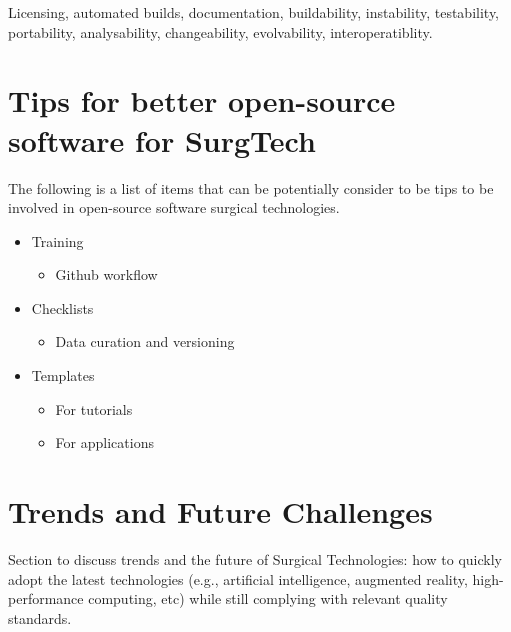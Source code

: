\documentclass{article}
\begin{document}
Licensing, automated builds, documentation, buildability, instability, testability, portability, analysability, changeability, evolvability, interoperatiblity. 






\section{Tips for better open-source software for SurgTech}
The following is a list of items that can be potentially consider to be tips to be involved in open-source software surgical technologies.
\begin{itemize}
\item Training 
    \begin{itemize}
    \item Github workflow
    \end{itemize}
\item Checklists
    \begin{itemize}
    \item Data curation and versioning
    \end{itemize}
\item Templates
    \begin{itemize}
    \item For tutorials
    \item For applications
    \end{itemize}
\end{itemize}



\section{Trends and Future Challenges}
Section to discuss trends and the future of Surgical Technologies: how to quickly adopt the latest technologies (e.g., artificial intelligence, augmented reality, high-performance computing, etc) while still complying with relevant quality standards.
\end{document}
